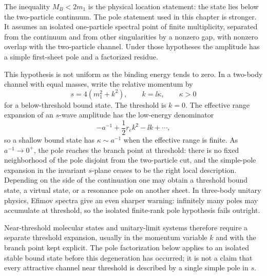 \begin{remark}
\label{rem:near-threshold-bound-state-poles}
The inequality \(M_B<2m_1\) is the physical location statement: the state lies
below the two-particle continuum.  The pole statement used in this chapter is
stronger.  It assumes an isolated one-particle spectral point of finite
multiplicity, separated from the continuum and from other singularities by a
nonzero gap, with nonzero overlap with the two-particle channel.  Under those
hypotheses the amplitude has a simple first-sheet pole and a factorized
residue.

This hypothesis is not uniform as the binding energy tends to zero.  In a
two-body channel with equal masses, write the relative momentum by
\[
  s=4(m_1^2+k^2),\qquad
  k=\ii\kappa,\qquad
  \kappa>0
\]
for a below-threshold bound state.  The threshold is \(k=0\).  The effective
range expansion of an \(s\)-wave amplitude has the low-energy denominator
\[
  -a^{-1}+\frac12 r_e k^2-\ii k+\cdots ,
\]
so a shallow bound state has \(\kappa\sim a^{-1}\) when the effective range is
finite.  As \(a^{-1}\to0^+\), the pole reaches the branch point at threshold:
there is no fixed neighborhood of the pole disjoint from the two-particle cut,
and the simple-pole expansion in the invariant \(s\)-plane ceases to be the
right local description.  Depending on the side of the continuation one may
obtain a threshold bound state, a virtual state, or a resonance pole on another
sheet.  In three-body unitary physics, Efimov spectra give an even sharper
warning: infinitely many poles may accumulate at threshold, so the isolated
finite-rank pole hypothesis fails outright.

Near-threshold molecular states and unitary-limit systems therefore require a
separate threshold expansion, usually in the momentum variable \(k\) and with
the branch point kept explicit.  The pole factorization below applies to an
isolated stable bound state before this degeneration has occurred; it is not a
claim that every attractive channel near threshold is described by a single
simple pole in \(s\).
\end{remark}

